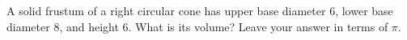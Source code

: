 A solid frustum of a right circular cone has upper base diameter $6$, lower base diameter $8$, and height $6$. What is its volume? Leave your answer in terms of $\pi$.
